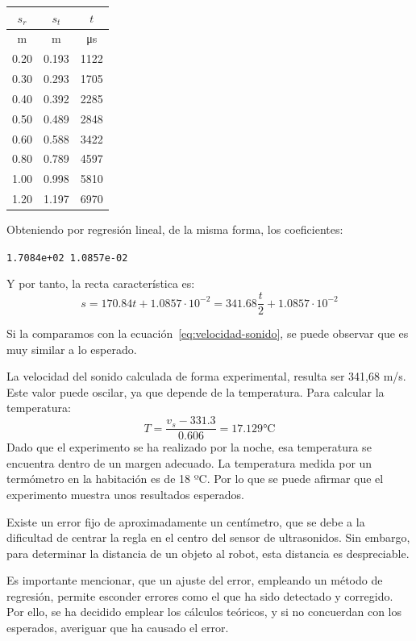 \documentclass[10pt,a4paper,hidelinks]{article}
\begin{document}
\begin{multicols}{2}
\begin{center}
\begin{tabular}{ | c | c | c | }
\hline
$s_{r}$ & $s_{t}$ & $t$\\ \hline
m & m & \si{\micro\second} \\ \hline \hline
0.20 & 0.193 & 1122 \\ \hline
0.30 & 0.293 & 1705 \\ \hline
0.40 & 0.392 & 2285 \\ \hline
0.50 & 0.489 & 2848 \\ \hline
0.60 & 0.588 & 3422 \\ \hline
0.80 & 0.789 & 4597 \\ \hline
1.00 & 0.998 & 5810 \\ \hline
1.20 & 1.197 & 6970 \\ \hline
\end{tabular}
\end{center}

Obteniendo por regresión lineal, de la misma forma, los coeficientes:
\begin{center}
\texttt{1.7084e+02   1.0857e-02}
\end{center}
Y por tanto, la recta característica es:
$$ s = 170.84 t + 1.0857\cdot 10^{-2} = 341.68\frac{t}{2} + 1.0857\cdot 10^{-2}
$$

Si la comparamos con la ecuación~\ref{eq:velocidad-sonido}, se puede observar 
que es muy similar a lo esperado.

La velocidad del sonido calculada de forma experimental, resulta ser 341,68 m/s.  
Este valor puede oscilar, ya que depende de la temperatura. Para calcular la 
temperatura:
$$ T = \frac{v_{s}-331.3}{0.606} = 17.129 \si{\celsius} $$
Dado que el experimento se ha realizado por la noche, esa temperatura se 
encuentra dentro de un margen adecuado. La temperatura medida por un termómetro 
en la habitación es de 18 ºC. Por lo que se puede afirmar que el experimento 
muestra unos resultados esperados.

Existe un error fijo de aproximadamente un centímetro, que se debe a la 
dificultad de centrar la regla en el centro del sensor de ultrasonidos. Sin 
embargo, para determinar la distancia de un objeto al robot, esta distancia es 
despreciable.

Es importante mencionar, que un ajuste del error, empleando un método de 
regresión, permite esconder errores como el que ha sido detectado y corregido.  
Por ello, se ha decidido emplear los cálculos teóricos, y si no concuerdan con 
los esperados, averiguar que ha causado el error.


\end{multicols}
\end{document}
